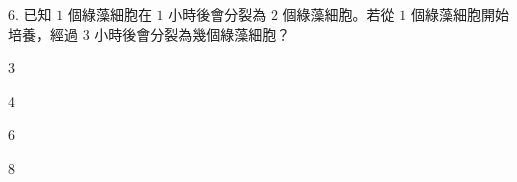 \documentclass[12pt]{article}
\begin{document}
\begin{problem}
  \item[6.] 已知 $1$ 個綠藻細胞在 $1$ 小時後會分裂為 $2$ 個綠藻細胞。若從 $1$ 個綠藻細胞開始培養，經過 $3$ 小時後會分裂為幾個綠藻細胞？ 
  \begin{choices}
    \item 3
    \item 4
    \item 6
    \item 8
  \end{choices}
\end{problem}
\end{document}
